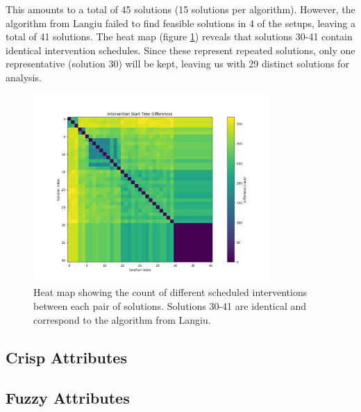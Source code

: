 This amounts to a total of 45 solutions (15 solutions per algorithm). However, the algorithm from Langiu failed to find feasible solutions in 4 of the setups, leaving a total of 41 solutions. The heat map (figure \ref{fig:dif_sol}) reveals that solutions 30-41 contain identical intervention schedules. Since these represent repeated solutions, only one representative (solution 30) will be kept, leaving us with 29 distinct solutions for analysis.

\begin{figure}[ht]
    \centering
    \includegraphics[width=0.8\textwidth]{ch3/figures/diff_sol.png}
    \caption{Heat map showing the count of different scheduled interventions between each pair of solutions. Solutions 30-41 are identical and correspond to the algorithm from Langiu.}
    \label{fig:dif_sol}
\end{figure}









\subsection{Crisp Attributes}



\subsection{Fuzzy Attributes}

